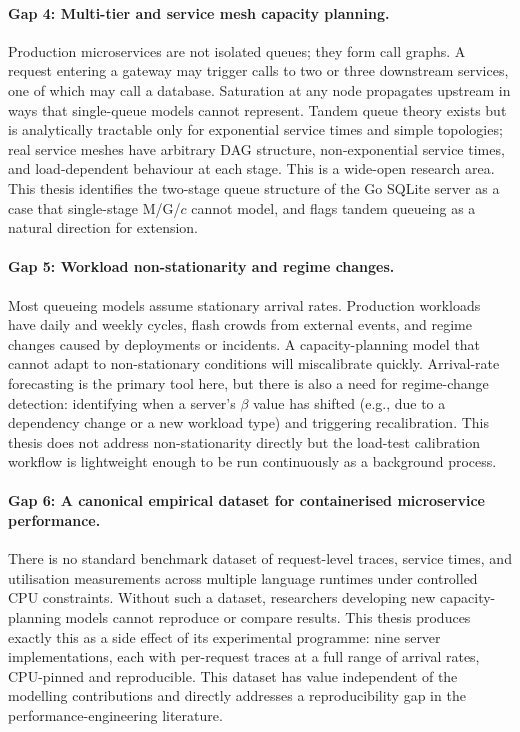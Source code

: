 \paragraph{Gap 4: Multi-tier and service mesh capacity planning.}
Production microservices are not isolated queues; they form call graphs. A request entering a gateway may trigger calls to two or three downstream services, one of which may call a database. Saturation at any node propagates upstream in ways that single-queue models cannot represent. Tandem queue theory exists but is analytically tractable only for exponential service times and simple topologies; real service meshes have arbitrary DAG structure, non-exponential service times, and load-dependent behaviour at each stage. This is a wide-open research area. This thesis identifies the two-stage queue structure of the Go SQLite server as a case that single-stage M/G/$c$ cannot model, and flags tandem queueing as a natural direction for extension.

\paragraph{Gap 5: Workload non-stationarity and regime changes.}
Most queueing models assume stationary arrival rates. Production workloads have daily and weekly cycles, flash crowds from external events, and regime changes caused by deployments or incidents. A capacity-planning model that cannot adapt to non-stationary conditions will miscalibrate quickly. Arrival-rate forecasting is the primary tool here, but there is also a need for regime-change detection: identifying when a server's $\beta$ value has shifted (e.g., due to a dependency change or a new workload type) and triggering recalibration. This thesis does not address non-stationarity directly but the load-test calibration workflow is lightweight enough to be run continuously as a background process.

\paragraph{Gap 6: A canonical empirical dataset for containerised microservice performance.}
There is no standard benchmark dataset of request-level traces, service times, and utilisation measurements across multiple language runtimes under controlled CPU constraints. Without such a dataset, researchers developing new capacity-planning models cannot reproduce or compare results. This thesis produces exactly this as a side effect of its experimental programme: nine server implementations, each with per-request traces at a full range of arrival rates, CPU-pinned and reproducible. This dataset has value independent of the modelling contributions and directly addresses a reproducibility gap in the performance-engineering literature.


